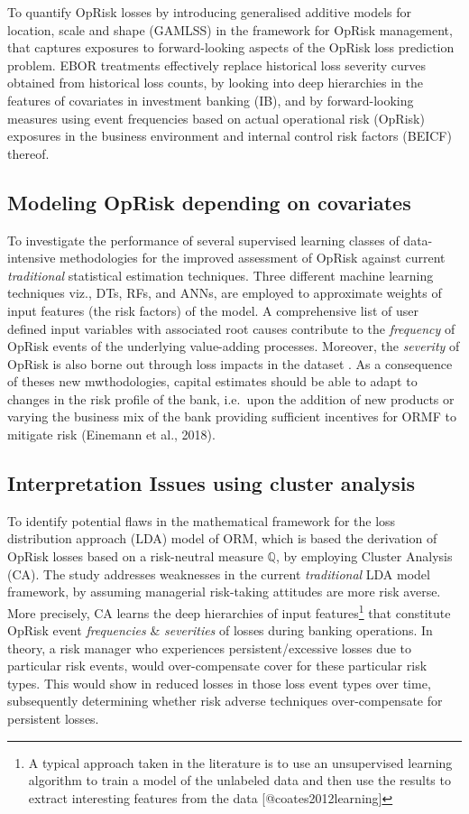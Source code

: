 \documentclass[]{DissertateUSU}
\let\rmarkdownfootnote\footnote%
\def\footnote{\protect\rmarkdownfootnote}
\begin{document}
To quantify OpRisk losses by introducing generalised additive models for
location, scale and shape (GAMLSS) in the framework for OpRisk
management, that captures exposures to forward-looking aspects of the
OpRisk loss prediction problem. EBOR treatments effectively replace
historical loss severity curves obtained from historical loss counts, by
looking into deep hierarchies in the features of covariates in
investment banking (IB), and by forward-looking measures using event
frequencies based on actual operational risk (OpRisk) exposures in the
business environment and internal control risk factors (BEICF) thereof.

\subsection{Modeling OpRisk depending on covariates}

To investigate the performance of several supervised learning classes of
data-intensive methodologies for the improved assessment of OpRisk
against current \emph{traditional} statistical estimation techniques.
Three different machine learning techniques viz., DTs, RFs, and ANNs,
are employed to approximate weights of input features (the risk factors)
of the model. A comprehensive list of user defined input variables with
associated root causes contribute to the \emph{frequency} of OpRisk
events of the underlying value-adding processes. Moreover, the
\emph{severity} of OpRisk is also borne out through loss impacts in the
dataset . As a consequence of theses new mwthodologies, capital
estimates should be able to adapt to changes in the risk profile of the
bank, i.e.~upon the addition of new products or varying the business mix
of the bank providing sufficient incentives for ORMF to mitigate risk
(Einemann et al., 2018).

\subsection{Interpretation Issues using cluster analysis}

To identify potential flaws in the mathematical framework for the loss
distribution approach (LDA) model of ORM, which is based the derivation
of OpRisk losses based on a risk-neutral measure \(\mathbb{Q}\), by
employing Cluster Analysis (CA). The study addresses weaknesses in the
current \emph{traditional} LDA model framework, by assuming managerial
risk-taking attitudes are more risk averse. More precisely, CA learns
the deep hierarchies of input
features\footnote{A typical approach taken in the literature is to use an unsupervised learning algorithm to train a model of the unlabeled data and then use the results to extract interesting features from the data [@coates2012learning]}
that constitute OpRisk event \emph{frequencies} \& \emph{severities} of
losses during banking operations. In theory, a risk manager who
experiences persistent/excessive losses due to particular risk events,
would over-compensate cover for these particular risk types. This would
show in reduced losses in those loss event types over time, subsequently
determining whether risk adverse techniques over-compensate for
persistent losses.
\end{document}
